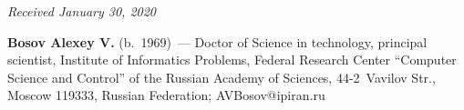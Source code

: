 \begin{multicols}{2}
{{ }
 }

\end{multicols}

\vspace*{-9pt}

\hfill{\small\textit{Received January 30, 2020}}





\Contrl

\noindent
\textbf{Bosov Alexey V.} (b.\ 1969)~--- Doctor of Science in technology, principal scientist, 
Institute of Informatics Problems, Federal Research Center ``Computer Science and Control'' of 
the Russian Academy of Sciences, 44-2~Vavilov Str., Moscow 119333, Russian Federation; 
\mbox{AVBosov@ipiran.ru}

\label{end\stat}

\renewcommand{\bibname}{\protect\rm Литература} 